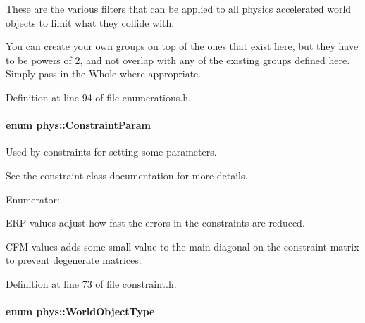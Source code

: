 These are the various filters that can be applied to all physics accelerated world objects to limit what they collide with. 

You can create your own groups on top of the ones that exist here, but they have to be powers of 2, and not overlap with any of the existing groups defined here. Simply pass in the Whole where appropriate. 

Definition at line 94 of file enumerations.h.

\hypertarget{namespacephys_aa1e7cf2d7efcaeaeac304f711e7564e8}{
\paragraph[{ConstraintParam}]{\setlength{\rightskip}{0pt plus 5cm}enum {\bf phys::ConstraintParam}}\hfill}
\label{namespacephys_aa1e7cf2d7efcaeaeac304f711e7564e8}


Used by constraints for setting some parameters. 

See the constraint class documentation for more details. \begin{Desc}
\item[Enumerator: ]\par
\begin{description}
\item[{\em 
\hypertarget{namespacephys_aa1e7cf2d7efcaeaeac304f711e7564e8a91b73a6b29e0251fecb859d93ca9475e}{
Con\_\-ERP}
\label{namespacephys_aa1e7cf2d7efcaeaeac304f711e7564e8a91b73a6b29e0251fecb859d93ca9475e}
}]ERP values adjust how fast the errors in the constraints are reduced. \item[{\em 
\hypertarget{namespacephys_aa1e7cf2d7efcaeaeac304f711e7564e8a787066a518df293eac194afbf6bd8da6}{
Con\_\-CFM}
\label{namespacephys_aa1e7cf2d7efcaeaeac304f711e7564e8a787066a518df293eac194afbf6bd8da6}
}]CFM values adds some small value to the main diagonal on the constraint matrix to prevent degenerate matrices. \end{description}
\end{Desc}



Definition at line 73 of file constraint.h.

\hypertarget{namespacephys_a56410935e1c614a932dbc91ee7330df1}{
\paragraph[{WorldObjectType}]{\setlength{\rightskip}{0pt plus 5cm}enum {\bf phys::WorldObjectType}}\hfill}
\label{namespacephys_a56410935e1c614a932dbc91ee7330df1}


